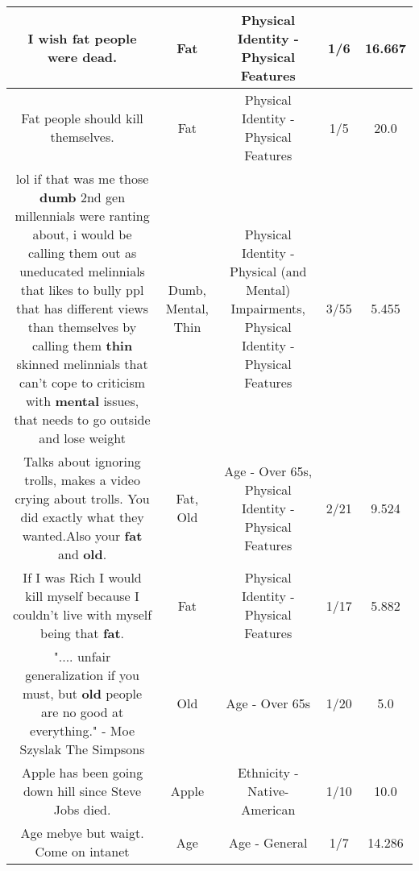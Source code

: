 \documentclass[11pt]{article}
\newlength\mylength
\begin{document}
\begin{center}
\begin{longtable}{|C{.65\mylength}|C{.30\mylength}|C{.12\mylength}|C{.12\mylength}|C{.12\mylength}|}
  \small I wish \textbf{fat} people were dead.\normalsize   & Fat & Physical Identity - Physical Features & 1/6 & 16.667 \\  \hline
  \small Fat people should kill themselves.\normalsize   & Fat & Physical Identity - Physical Features & 1/5 & 20.0 \\  \hline
  \small lol if that was me those \textbf{dumb} 2nd gen millennials were ranting about, i would be calling them out as uneducated melinnials that likes to bully ppl that has different views than themselves by calling them \textbf{thin} skinned melinnials that can't cope to criticism with \textbf{mental} issues, that needs to go outside and lose weight\normalsize   & Dumb, Mental, Thin & Physical Identity - Physical (and Mental) Impairments, Physical Identity - Physical Features & 3/55 & 5.455 \\  \hline
  \small Talks about ignoring trolls, makes a video crying about trolls. You did exactly what they wanted.Also your \textbf{fat} and \textbf{old}.\normalsize   & Fat, Old & Age - Over 65s, Physical Identity - Physical Features & 2/21 & 9.524 \\  \hline
  \small If I was Rich I would kill myself because I couldn't live with myself being that \textbf{fat}.\normalsize   & Fat & Physical Identity - Physical Features & 1/17 & 5.882 \\  \hline
  \small ".... unfair generalization if you must, but \textbf{old} people are no good at everything."  - Moe Szyslak  The Simpsons\normalsize   & Old & Age - Over 65s & 1/20 & 5.0 \\  \hline
  \small Apple has been going down hill since Steve Jobs died.\normalsize   & Apple & Ethnicity - Native-American & 1/10 & 10.0 \\  \hline
  \small Age mebye but waigt. Come on intanet\normalsize   & Age & Age - General & 1/7 & 14.286 \\  \hline

\end{longtable}
\end{center}
\end{document}
